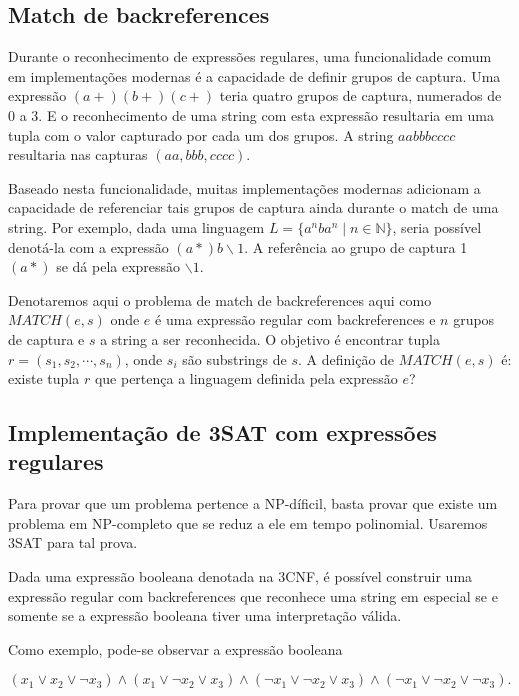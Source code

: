 \documentclass[a4paper,12pt,oneside,onecolumn]{uerj}
\begin{document}
\subsection{Match de backreferences}

Durante o reconhecimento de expressões regulares, uma funcionalidade comum em implementações modernas é a capacidade de definir grupos de captura. Uma expressão $(a+)(b+)(c+)$ teria quatro grupos de captura, numerados de 0 a 3. E o reconhecimento de uma string com esta expressão resultaria em uma tupla com o valor capturado por cada um dos grupos. A string $aabbbcccc$ resultaria nas capturas $(aa, bbb, cccc)$.

Baseado nesta funcionalidade, muitas implementações modernas adicionam a capacidade de referenciar tais grupos de captura ainda durante o match de uma string. Por exemplo, dada uma linguagem $L = \{a^nba^n \mid n \in \mathbb{N}\}$, seria possível denotá-la com a expressão $(a*)b \backslash 1$. A referência ao grupo de captura 1 $(a*)$ se dá pela expressão $\backslash 1$.

Denotaremos aqui o problema de match de backreferences aqui como $MATCH(e, s)$ onde $e$ é uma expressão regular com backreferences e $n$ grupos de captura e $s$ a string a ser reconhecida. O objetivo é encontrar tupla $r = (s_1, s_2, \cdots, s_n)$, onde $s_i$ são substrings de $s$. A definição de $MATCH(e, s)$ é: existe tupla $r$ que pertença a linguagem definida pela expressão $e$?

\subsection{Implementação de 3SAT com expressões regulares}

Para provar que um problema pertence a NP-díficil, basta provar que existe um problema em NP-completo que se reduz a ele em tempo polinomial. Usaremos 3SAT para tal prova.

Dada uma expressão booleana denotada na 3CNF, é possível construir uma expressão regular com backreferences que reconhece uma string em especial se e somente se a expressão booleana tiver uma interpretação válida.

Como exemplo, pode-se observar a expressão booleana

\setlength\abovedisplayskip{0pt}
\begin{equation*}
(x_1 \lor x_2 \lor \neg x_3) \wedge 
(x_1 \lor \neg x_2 \lor x_3) \wedge
(\neg x_1 \lor \neg x_2 \lor x_3) \wedge 
(\neg x_1 \lor \neg x_2 \lor \neg x_3).
\end{equation*}
\end{document}
